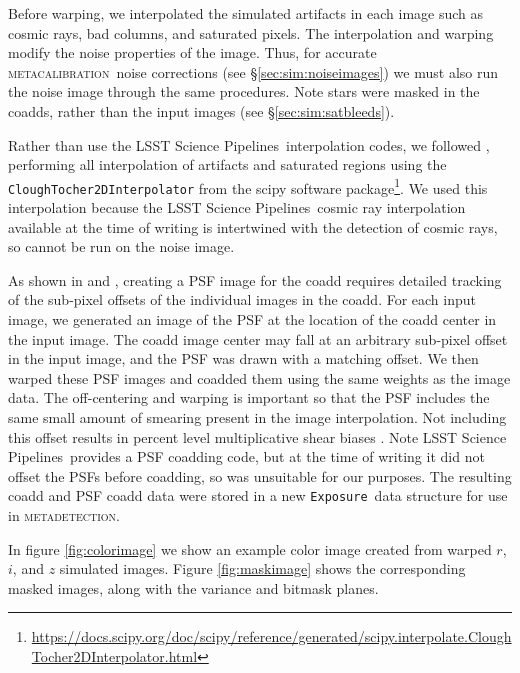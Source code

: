\documentclass[twocolumn,twocolappendix,astrosym]{openjournal}
\newcommand{\calexp}{\texttt{Exposure}}
\newcommand{\dm}{LSST Science Pipelines}
\newcommand{\mcal}{\textsc{metacalibration}}
\newcommand{\mdet}{\textsc{metadetection}}
\begin{document}
Before warping, we interpolated the simulated artifacts in each image such as
cosmic rays, bad columns, and saturated pixels.  The interpolation and warping
modify the noise properties of the image.  Thus, for accurate \mcal\ noise
corrections (see \S \ref{sec:sim:noiseimages}) we must also run the noise image
through the same procedures.  Note stars were masked in the coadds, rather than
the input images (see \S \ref{sec:sim:satbleeds}).

Rather than use the \dm\ interpolation codes, we followed \citet{BeckerMdetCoadd},
performing all interpolation of artifacts and saturated regions using the
\texttt{CloughTocher2DInterpolator} from the scipy software
package\footnote{\url{https://docs.scipy.org/doc/scipy/reference/generated/scipy.interpolate.CloughTocher2DInterpolator.html}}.
We used this interpolation because the \dm\ cosmic ray interpolation available
at the time of writing is intertwined with the detection of cosmic rays, so
cannot be run on the noise image.

As shown in \citet{ArmstrongCoadd} and \citet{BeckerMdetCoadd}, creating a PSF
image for the coadd requires detailed tracking of the sub-pixel offsets of the
individual images in the coadd. For each input image, we generated an image of
the PSF at the location of the coadd center in the input image. The coadd image
center may fall at an arbitrary sub-pixel offset in the input image, and the
PSF was drawn with a matching offset.  We then warped these PSF images and
coadded them using the same weights as the image data. The off-centering and
warping is important so that the PSF includes the same small amount of smearing
present in the image interpolation. Not including this offset results in
percent level multiplicative shear biases \citep{ArmstrongCoadd}. Note \dm\
provides a PSF coadding code, but at the time of writing it did not offset the
PSFs before coadding, so was unsuitable for our purposes. The resulting coadd
and PSF coadd data were stored in a new \calexp\ data structure for use in
\mdet.

In figure \ref{fig:colorimage} we show an example color image created from
warped $r$, $i$, and $z$ simulated images.  Figure \ref{fig:maskimage} shows
the corresponding masked images, along with the variance and bitmask planes.
\end{document}
